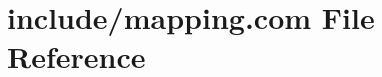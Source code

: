 \hypertarget{home_2abonfi_2_c_f_d__codes_2_eul_f_s_83_84_2include_2mapping_8com}{\section{include/mapping.com File Reference}
\label{home_2abonfi_2_c_f_d__codes_2_eul_f_s_83_84_2include_2mapping_8com}
}
